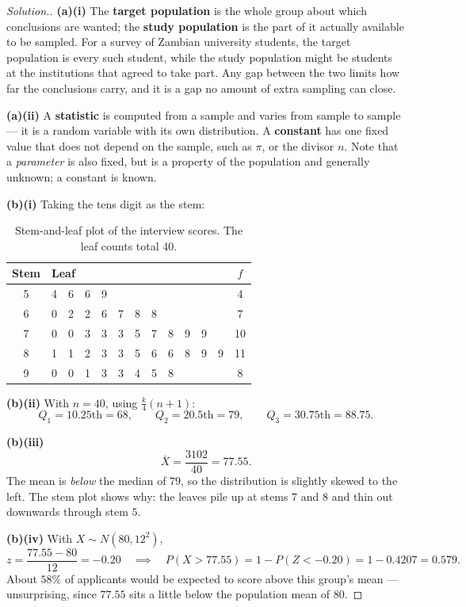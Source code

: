 \documentclass[11pt,a4paper]{article}
\theoremstyle{definition}
\newenvironment{solution}
  {\renewcommand{\qedsymbol}{}\begin{proof}[\textit{Solution}.]}
  {\end{proof}}
\begin{document}
\begin{solution}
\textbf{(a)(i)} The \textbf{target population} is the whole group about which conclusions are
wanted; the \textbf{study population} is the part of it actually available to be sampled. For
a survey of Zambian university students, the target population is every such student, while
the study population might be students at the institutions that agreed to take part. Any gap
between the two limits how far the conclusions carry, and it is a gap no amount of extra
sampling can close.

\textbf{(a)(ii)} A \textbf{statistic} is computed from a sample and varies from sample to
sample --- it is a random variable with its own distribution. A \textbf{constant} has one
fixed value that does not depend on the sample, such as $\pi$, or the divisor $n$. Note that a
\emph{parameter} is also fixed, but is a property of the population and generally unknown; a
constant is known.

\textbf{(b)(i)} Taking the tens digit as the stem:
\begin{table}[H]
\centering
\begin{tabular}{c|l|c}
Stem & Leaf & $f$\\
\hline
5 & 4\ \ 6\ \ 6\ \ 9 & 4\\
6 & 0\ \ 2\ \ 2\ \ 6\ \ 7\ \ 8\ \ 8 & 7\\
7 & 0\ \ 0\ \ 3\ \ 3\ \ 3\ \ 5\ \ 7\ \ 8\ \ 9\ \ 9 & 10\\
8 & 1\ \ 1\ \ 2\ \ 3\ \ 3\ \ 5\ \ 6\ \ 6\ \ 8\ \ 9\ \ 9 & 11\\
9 & 0\ \ 0\ \ 1\ \ 3\ \ 3\ \ 4\ \ 5\ \ 8 & 8\\
\hline
\end{tabular}
\caption{Stem-and-leaf plot of the interview scores. The leaf counts total 40.}
\end{table}

\textbf{(b)(ii)} With $n=40$, using $\tfrac{k}{4}(n+1)$:
\[Q_1=10.25\text{th}=68,\qquad Q_2=20.5\text{th}=79,\qquad Q_3=30.75\text{th}=88.75.\]

\textbf{(b)(iii)}
\[\overline{X}=\frac{3102}{40}=77.55.\]
The mean is \emph{below} the median of $79$, so the distribution is slightly skewed to the
left. The stem plot shows why: the leaves pile up at stems $7$ and $8$ and thin out downwards
through stem $5$.

\textbf{(b)(iv)} With $X\sim N(80,12^2)$,
\[z=\frac{77.55-80}{12}=-0.20\quad\implies\quad P(X>77.55)=1-P(Z<-0.20)=1-0.4207=0.579.\]
About $58\%$ of applicants would be expected to score above this group's mean --- unsurprising,
since $77.55$ sits a little below the population mean of $80$.
\end{solution}
\end{document}
